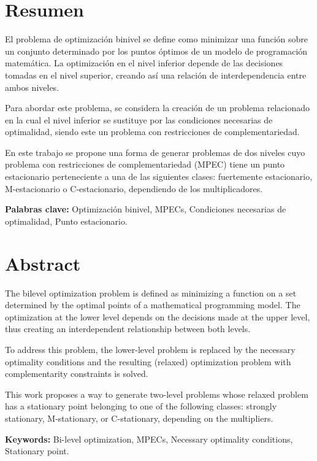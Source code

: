 \chapter*{Resumen}

El problema de optimización binivel se define como minimizar una función sobre un conjunto determinado por los puntos óptimos de un modelo de programación matemática. La optimización en el nivel inferior depende de las decisiones tomadas en el nivel superior, creando así una relación de interdependencia entre ambos niveles.

Para abordar este problema, se considera la creación de un problema relacionado en la cual el nivel inferior se sustituye por las condiciones necesarias de optimalidad, siendo este un problema con restricciones de complementariedad.

En este trabajo se propone una forma de generar problemas de dos niveles cuyo problema con restricciones de complementariedad (MPEC) tiene un punto estacionario perteneciente a una de las siguientes 
clases: fuertemente estacionario, M-estacionario o C-estacionario, dependiendo de los multiplicadores.


\textbf{Palabras clave:} Optimización binivel, MPECs, Condiciones necesarias de optimalidad, Punto estacionario.

\chapter*{Abstract}
The bilevel optimization problem is defined as minimizing a function on a set determined by the optimal points of a mathematical programming model. The optimization at the lower level depends on the decisions made at the upper level, thus creating an interdependent relationship between both levels.

To address this problem, the lower-level problem is replaced by the necessary optimality conditions and the resulting (relaxed) optimization problem with complementarity constraints is solved.

This work proposes a way to generate two-level problems whose relaxed problem has a stationary point belonging to one of the following classes: strongly stationary, M-stationary, or C-stationary, depending on the multipliers.

\textbf{Keywords:} Bi-level optimization, MPECs, Necessary optimality conditions, Stationary point.
